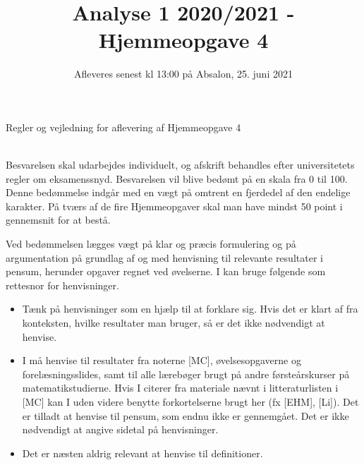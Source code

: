 \documentclass{article}
\title{Analyse 1 2020/2021 - Hjemmeopgave 4}
\author{}
\date{\vspace{-1cm}Afleveres senest kl 13:00 på Absalon, 25. juni 2021}
\newif\ifrules
\begin{document}
	
	\maketitle
	
	\noindent
	
	
	
	\ifrules
	\newpage
	\noindent
	{\LARGE Regler og vejledning for aflevering af Hjemmeopgave 4}
	
	\noindent\hrulefill \\
	
	\noindent
	Besvarelsen skal udarbejdes individuelt, og afskrift behandles efter universitetets regler om eksamenssnyd. Besvarelsen vil blive bedømt på en skala fra 0 til 100. Denne bedømmelse indgår med en vægt på omtrent en fjerdedel af den endelige karakter. På tværs af de fire Hjemmeopgaver skal man have mindst 50 point i gennemsnit for at bestå.
	
	Ved bedømmelsen lægges vægt på klar og præcis formulering og på argumentation på grundlag af og med henvisning til relevante resultater i pensum, herunder opgaver regnet ved øvelserne. I kan bruge følgende som rettesnor for henvisninger.
	\begin{itemize}
		\item Tænk på henvisninger som en hjælp til at forklare sig. Hvis det er klart af fra konteksten, hvilke resultater man bruger, så er det ikke nødvendigt at henvise.
		
		\item I må henvise til resultater fra noterne [MC], øvelsesopgaverne og forelæsningsslides, samt til alle l\ae{}reb\o{}ger brugt p\aa{} andre f\o{}rste\aa{}rskurser p\aa{} matematikstudierne. Hvis I citerer fra materiale n\ae{}vnt i litteraturlisten i [MC] kan I uden videre benytte forkortelserne brugt her (fx [EHM], [Li]). Det er tilladt at henvise til pensum, som endnu ikke er gennemgået. Det er ikke nødvendigt at angive sidetal på henvisninger. 
		
		\item Det er næsten aldrig relevant at henvise til definitioner.
	\end{itemize}
	
	
\end{document}
